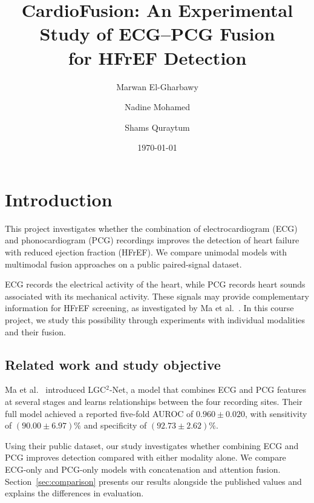 \documentclass[11pt,a4paper]{article}
\title{CardioFusion: An Experimental Study of ECG--PCG Fusion\\for HFrEF Detection}
\author{Marwan El-Gharbawy \and Nadine Mohamed \and Shams Quraytum}
\date{\today}
\newcommand{\draftnote}[1]{\par\smallskip\noindent\textcolor{blue}{\textbf{To write:} #1}\par\smallskip}
\begin{document}
\maketitle

%
\section{Introduction}
\label{sec:introduction}

This project investigates whether the combination of electrocardiogram (ECG) and
phonocardiogram (PCG) recordings improves the detection of heart
failure with reduced ejection fraction (HFrEF). We compare unimodal models
with multimodal fusion approaches on a public paired-signal dataset.

ECG records the electrical activity of the heart, while PCG records heart
sounds associated with its mechanical activity. These signals may provide
complementary information for HFrEF screening, as investigated by
Ma et al.~\cite{ma2026hierarchical}. In this course project, we study this
possibility through experiments with individual modalities and their fusion.


\subsection{Related work and study objective}
Ma et al.~\cite{ma2026hierarchical} introduced LGC$^{2}$-Net, a model that
combines ECG and PCG features at several stages and learns relationships
between the four recording sites. Their full model achieved a reported
five-fold AUROC of $0.960\pm0.020$, with sensitivity of
$(90.00\pm6.97)\%$ and specificity of $(92.73\pm2.62)\%$.

Using their public dataset, our study investigates whether combining ECG
and PCG improves detection compared with either modality alone. We compare
ECG-only and PCG-only models with concatenation and attention fusion.
Section~\ref{sec:comparison} presents our results alongside the published
values and explains the differences in evaluation.
\end{document}
